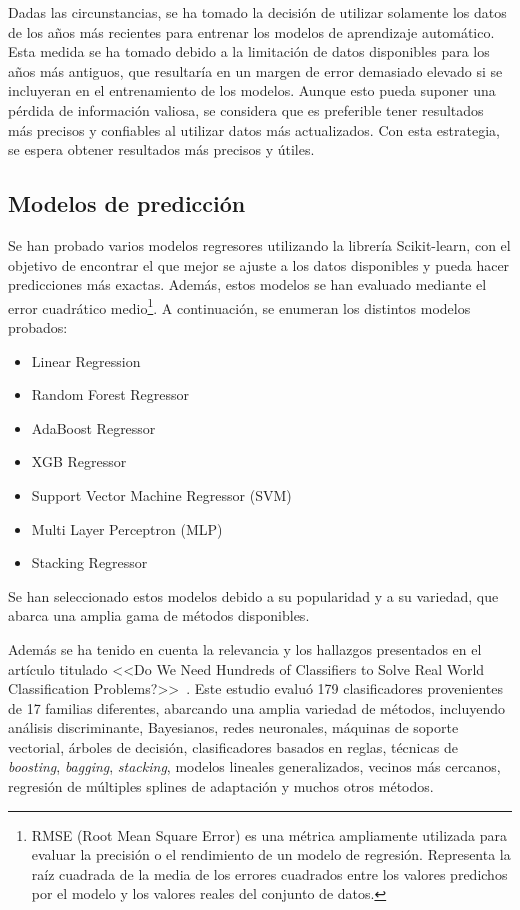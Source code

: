 Dadas las circunstancias, se ha tomado la decisión de utilizar solamente los datos de los años más recientes para entrenar los modelos de aprendizaje automático. Esta medida se ha tomado debido a la limitación de datos disponibles para los años más antiguos, que resultaría en un margen de error demasiado elevado si se incluyeran en el entrenamiento de los modelos. Aunque esto pueda suponer una pérdida de información valiosa, se considera que es preferible tener resultados más precisos y confiables al utilizar datos más actualizados. Con esta estrategia, se espera obtener resultados más precisos y útiles.

\subsection{Modelos de predicción}

Se han probado varios modelos regresores utilizando la librería Scikit-learn, con el objetivo de encontrar el que mejor se ajuste a los datos disponibles y pueda hacer predicciones más exactas. Además, estos modelos se han evaluado mediante el error cuadrático medio\footnote{RMSE (Root Mean Square Error) es una métrica ampliamente utilizada para evaluar la precisión o el rendimiento de un modelo de regresión. Representa la raíz cuadrada de la media de los errores cuadrados entre los valores predichos por el modelo y los valores reales del conjunto de datos.}. A continuación, se enumeran los distintos modelos probados:
\begin{itemize}
    \item Linear Regression 
    \item Random Forest Regressor
    \item AdaBoost Regressor
    \item XGB Regressor
    \item Support Vector Machine Regressor (SVM)
    \item Multi Layer Perceptron (MLP)
    \item Stacking Regressor
\end{itemize}

Se han seleccionado estos modelos debido a su popularidad y a su variedad, que abarca una amplia gama de métodos disponibles.

Además se ha tenido en cuenta la relevancia y los hallazgos presentados en el artículo titulado <<Do We Need Hundreds of Classifiers to Solve Real World Classification Problems?>>~\cite{fer2014}. Este estudio evaluó 179 clasificadores provenientes de 17 familias diferentes, abarcando una amplia variedad de métodos, incluyendo análisis discriminante, Bayesianos, redes neuronales, máquinas de soporte vectorial, árboles de decisión, clasificadores basados en reglas, técnicas de \textit{boosting}, \textit{bagging}, \textit{stacking}, modelos lineales generalizados, vecinos más cercanos, regresión de múltiples splines de adaptación y muchos otros métodos. 

